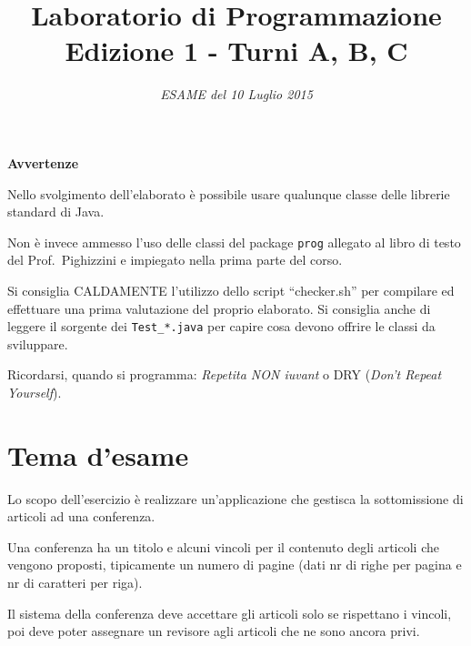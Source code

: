 \documentclass[a4paper]{article}
\title{Laboratorio di Programmazione\\
Edizione 1 - Turni A, B, C}
\date{\textit{ESAME del 10 Luglio 2015}}
\begin{document}
\maketitle

\textbf{Avvertenze}

\begin{compactitem}
\item 
Nello svolgimento dell'elaborato è possibile
usare qualunque classe delle librerie standard di Java.

\item Non è invece
ammesso l'uso delle classi del package {\tt prog} allegato al libro di
testo del Prof.~Pighizzini e impiegato nella prima parte del corso.

\item Si consiglia CALDAMENTE l'utilizzo dello script ``checker.sh'' per 
compilare ed effettuare una prima valutazione del proprio elaborato.
Si consiglia anche di leggere il sorgente dei \texttt{Test\_*.java} per 
capire cosa devono offrire le classi da sviluppare.

\item Ricordarsi, quando si programma: \emph{Repetita NON iuvant} o DRY (\emph{Don't Repeat Yourself}).


\end{compactitem}


\section*{Tema d'esame}

Lo scopo dell'esercizio è realizzare un'applicazione che gestisca la 
sottomissione di articoli ad una conferenza.

Una conferenza ha un titolo e alcuni vincoli per il contenuto degli articoli 
che vengono proposti, tipicamente un numero di pagine (dati nr di righe per 
pagina e nr di caratteri per riga).

Il sistema della conferenza deve accettare gli articoli solo se rispettano i 
vincoli, poi deve poter assegnare un revisore agli articoli che ne sono ancora 
privi.
\end{document}
